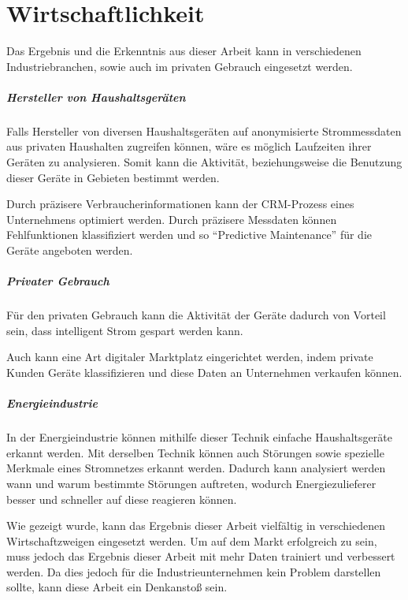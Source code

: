 \chapter{Wirtschaftlichkeit}
    Das Ergebnis und die Erkenntnis aus dieser Arbeit kann in verschiedenen Industriebranchen, sowie auch im privaten Gebrauch eingesetzt werden.

    \paragraph{Hersteller von Haushaltsgeräten}
    Falls Hersteller von diversen Haushaltsgeräten auf anonymisierte Strommessdaten aus privaten Haushalten zugreifen können, wäre es möglich Laufzeiten ihrer Geräten zu analysieren.
    Somit kann die Aktivität, beziehungsweise die Benutzung dieser Geräte in Gebieten bestimmt werden. 
    
    Durch präzisere Verbraucherinformationen kann der \ac{CRM}-Prozess eines Unternehmens optimiert werden.
    Durch präzisere Messdaten können Fehlfunktionen klassifiziert werden und so "`Predictive Maintenance"' für die Geräte angeboten werden.

    \paragraph{Privater Gebrauch}
    Für den privaten Gebrauch kann die Aktivität der Geräte dadurch von Vorteil sein, dass intelligent Strom gespart werden kann.
    
    Auch kann eine Art digitaler Marktplatz eingerichtet werden, indem private Kunden Geräte klassifizieren und diese Daten an Unternehmen verkaufen können.

    \paragraph{Energieindustrie}
    In der Energieindustrie können mithilfe dieser Technik einfache Haushaltsgeräte erkannt werden. 
    Mit derselben Technik können auch Störungen sowie spezielle Merkmale eines Stromnetzes erkannt werden. 
    Dadurch kann analysiert werden wann und warum bestimmte Störungen auftreten, wodurch Energiezulieferer besser und schneller auf diese reagieren können.
    \newline

    Wie gezeigt wurde, kann das Ergebnis dieser Arbeit vielfältig in verschiedenen Wirtschaftzweigen eingesetzt werden.
    Um auf dem Markt erfolgreich zu sein, muss jedoch das Ergebnis dieser Arbeit mit mehr Daten trainiert und verbessert werden.
    Da dies jedoch für die Industrieunternehmen kein Problem darstellen sollte, kann diese Arbeit ein Denkanstoß sein.